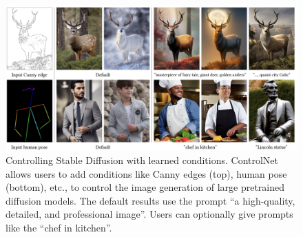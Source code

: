 \begin{figure}[H]
    \centering
    \includegraphics[width=1\textwidth]{images/controlnet_result.png}
    \caption{Controlling Stable Diffusion with learned conditions. ControlNet allows users to add conditions like Canny edges
    (top), human pose (bottom), etc., to control the image generation of large pretrained diffusion models. The default results use
    the prompt “a high-quality, detailed, and professional image”. Users can optionally give prompts like the “chef in kitchen”. \cite*{ControlNet}}
\end{figure}




